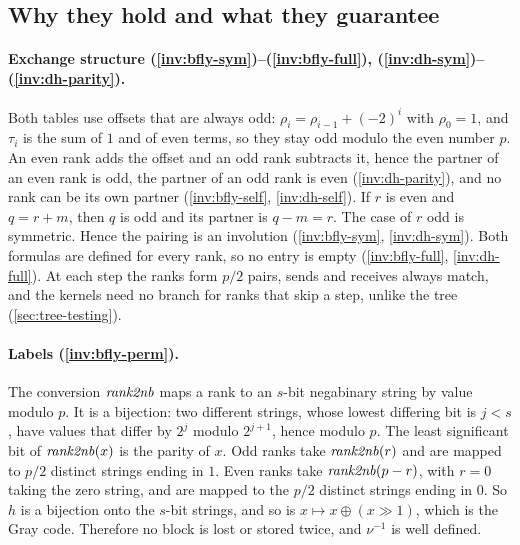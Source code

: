 \subsection{Why they hold and what they guarantee}

\paragraph{Exchange structure (\ref{inv:bfly-sym})--(\ref{inv:bfly-full}), (\ref{inv:dh-sym})--(\ref{inv:dh-parity}).}
Both tables use offsets that are always odd: $\rho_i=\rho_{i-1}+(-2)^i$ with $\rho_0=1$, and $\tau_i$ is the sum of $1$ and of even terms, so they stay odd modulo the even number $p$.
An even rank adds the offset and an odd rank subtracts it, hence the partner of an even rank is odd, the partner of an odd rank is even (\ref{inv:dh-parity}), and no rank can be its own partner (\ref{inv:bfly-self}, \ref{inv:dh-self}).
If $r$ is even and $q=r+m$, then $q$ is odd and its partner is $q-m=r$. The case of $r$ odd is symmetric.
Hence the pairing is an involution (\ref{inv:bfly-sym}, \ref{inv:dh-sym}).
Both formulas are defined for every rank, so no entry is empty (\ref{inv:bfly-full}, \ref{inv:dh-full}).
At each step the ranks form $p/2$ pairs, sends and receives always match, and the kernels need no branch for ranks that skip a step, unlike the tree (\cref{sec:tree-testing}).

\paragraph{Labels (\ref{inv:bfly-perm}).}
The conversion $\mathit{rank2nb}$ maps a rank to an $s$-bit negabinary string by value modulo $p$.
It is a bijection: two different strings, whose lowest differing bit is $j<s$, have values that differ by $2^j$ modulo $2^{j+1}$, hence modulo $p$.
The least significant bit of $\mathit{rank2nb}(x)$ is the parity of $x$.
Odd ranks take $\mathit{rank2nb}(r)$ and are mapped to $p/2$ distinct strings ending in $1$. Even ranks take $\mathit{rank2nb}(p-r)$, with $r=0$ taking the zero string, and are mapped to the $p/2$ distinct strings ending in $0$.
So $h$ is a bijection onto the $s$-bit strings, and so is $x\mapsto x\oplus(x\gg1)$, which is the Gray code.
Therefore no block is lost or stored twice, and $\nu^{-1}$ is well defined.

